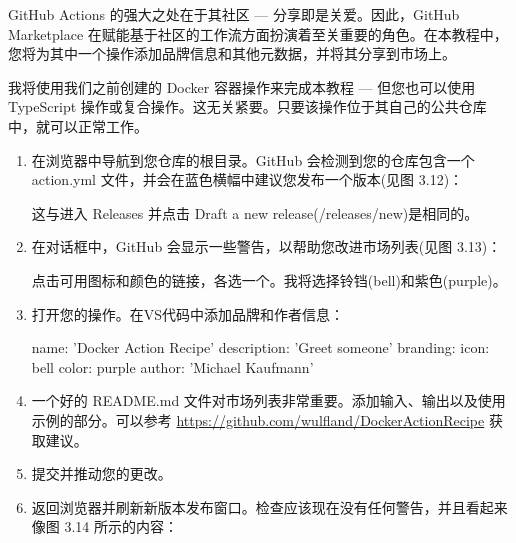 GitHub Actions 的强大之处在于其社区 --- 分享即是关爱。因此，GitHub Marketplace 在赋能基于社区的工作流方面扮演着至关重要的角色。在本教程中，您将为其中一个操作添加品牌信息和其他元数据，并将其分享到市场上。


我将使用我们之前创建的 Docker 容器操作来完成本教程 --- 但您也可以使用 TypeScript 操作或复合操作。这无关紧要。只要该操作位于其自己的公共仓库中，就可以正常工作。


\begin{enumerate}
\item 
在浏览器中导航到您仓库的根目录。GitHub 会检测到您的仓库包含一个 action.yml 文件，并会在蓝色横幅中建议您发布一个版本(见图 3.12)：


这与进入 Releases 并点击 Draft a new release(/releases/new)是相同的。

\item 
在对话框中，GitHub 会显示一些警告，以帮助您改进市场列表(见图 3.13)：


点击可用图标和颜色的链接，各选一个。我将选择铃铛(bell)和紫色(purple)。

\item 
打开您的操作。在VS代码中添加品牌和作者信息：

\begin{shell}
name: 'Docker Action Recipe'
description: 'Greet someone'
branding:
  icon: bell
  color: purple
author: 'Michael Kaufmann'
\end{shell}

\item 
一个好的 README.md 文件对市场列表非常重要。添加输入、输出以及使用示例的部分。可以参考 \url{https://github.com/wulfland/DockerActionRecipe} 获取建议。

\item 
提交并推动您的更改。

\item 
返回浏览器并刷新新版本发布窗口。检查应该现在没有任何警告，并且看起来像图 3.14 所示的内容：



\end{enumerate}
